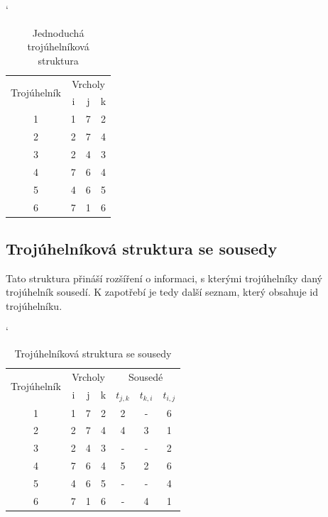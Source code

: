 \documentclass[12pt,a4paper]{article}
\begin{document}
{\begin{table}[h]
\catcode`
\begin{tabular}{|c||c|c|c|}
\hline
\multirow{2}{*}{Trojúhelník} & \multicolumn{3}{c|}{Vrcholy} \\ \cline{2-4} 
                             & i        & j       & k       \\ \hline \hline
1                            & 1        & 7       & 2       \\ \hline
2                            & 2        & 7       & 4       \\ \hline
3                            & 2        & 4       & 3       \\ \hline
4                            & 7        & 6       & 4       \\ \hline
5                            & 4        & 6       & 5       \\ \hline
6                            & 7        & 1       & 6       \\ \hline
\end{tabular}
\caption{Jednoduchá trojúhelníková struktura}
\label{tab:troj_struktura_simple}
\end{table}



\subsection{Trojúhelníková struktura se sousedy}

Tato struktura přináší rozšíření o informaci, s kterými trojúhelníky
daný trojúhelník sousedí. K zapotřebí je tedy další seznam, který
obsahuje id trojúhelníku.

\begin{table}[h]
\catcode`
\begin{tabular}{|c||c|c|c||c|c|c|}
\hline
\multirow{2}{*}{Trojúhelník} & \multicolumn{3}{|c|}{Vrcholy} & \multicolumn{3}{|c|}{Sousedé}      \\ \cline{2-7} 
                             & i        & j       & k       & $t_{j,k}$ & $t_{k,i}$ & $t_{i,j}$ \\ \hline \hline
1                            & 1        & 7       & 2       & 2         & -         & 6         \\ \hline
2                            & 2        & 7       & 4       & 4         & 3         & 1         \\ \hline
3                            & 2        & 4       & 3       & -         & -         & 2         \\ \hline
4                            & 7        & 6       & 4       & 5         & 2         & 6         \\ \hline
5                            & 4        & 6       & 5       & -         & -         & 4         \\ \hline
6                            & 7        & 1       & 6       & -         & 4         & 1         \\ \hline
\end{tabular}
\caption{Trojúhelníková struktura se sousedy}
\label{tab:troj_strukt_sous}
\end{table}

}
\end{document}
